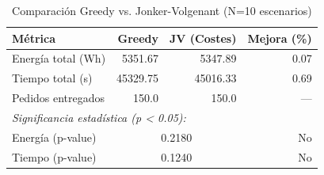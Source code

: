 \begin{table}[htbp]
\centering
\caption{Comparación Greedy vs. Jonker-Volgenant (N=10 escenarios)}
\label{tab:comparison}
\begin{tabular}{lrrr}
\hline
\textbf{Métrica} & \textbf{Greedy} & \textbf{JV (Costes)} & \textbf{Mejora (\%)} \\
\hline
Energía total (Wh) & 5351.67 & 5347.89 & 0.07 \\
Tiempo total (s) & 45329.75 & 45016.33 & 0.69 \\
Pedidos entregados & 150.0 & 150.0 & — \\
\hline
\multicolumn{4}{l}{\textit{Significancia estadística (p < 0.05):}} \\
Energía (p-value) & \multicolumn{2}{c}{0.2180} & No \\
Tiempo (p-value) & \multicolumn{2}{c}{0.1240} & No \\
\hline
\end{tabular}
\end{table}